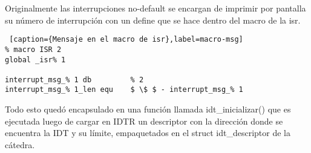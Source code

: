 Originalmente las interrupciones no-default se encargan de imprimir por pantalla su número de interrupción con un define que se hace dentro del macro de la isr.
\begin{lstlisting} [caption={Mensaje en el macro de isr},label=macro-msg]
% macro ISR 2
global _isr% 1

interrupt_msg_% 1 db         % 2
interrupt_msg_% 1_len equ    $ \$ $ - interrupt_msg_% 1

\end{lstlisting}

Todo esto quedó encapsulado en una función llamada idt_inicializar() que es ejecutada luego de cargar en IDTR un descriptor con la dirección donde se encuentra la IDT y su límite, empaquetados en el struct idt_descriptor de la cátedra.

